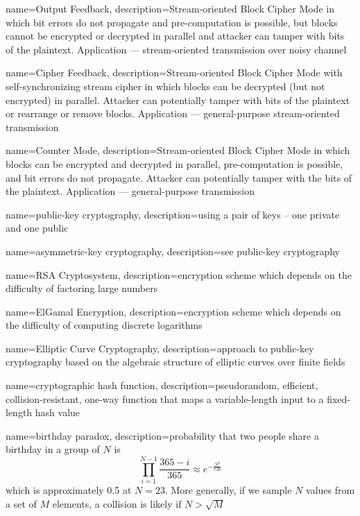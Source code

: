 {
    name={Output Feedback},
    description={Stream-oriented Block Cipher Mode in which bit errors do not propagate and pre-computation is possible, but blocks cannot be encrypted or decrypted in parallel and attacker can tamper with bits of the plaintext. Application --- stream-oriented transmission over noisy channel}
}

{
    name={Cipher Feedback},
    description={Stream-oriented Block Cipher Mode with self-synchronizing stream cipher in which blocks can be decrypted (but not encrypted) in parallel. Attacker can potentially tamper with bits of the plaintext or rearrange or remove blocks. Application --- general-purpose stream-oriented transmission}
}

{
    name={Counter Mode},
    description={Stream-oriented Block Cipher Mode in which blocks can be encrypted and decrypted in parallel, pre-computation is possible, and bit errors do not propagate. Attacker can potentially tamper with the bits of the plaintext. Application --- general-purpose transmission}
}

{
    name={public-key cryptography},
    description={using a pair of keys -- one private and one public}
}

{
    name={asymmetric-key cryptography},
    description={see \gls{public-key cryptography}}
}

{
    name={RSA Cryptosystem},
    description={encryption scheme which depends on the difficulty of factoring large numbers}
}

{
    name={ElGamal Encryption},
    description={encryption scheme which depends on the difficulty of computing discrete logarithms}
}

{
    name={Elliptic Curve Cryptography},
    description={approach to public-key cryptography based on the algebraic structure of elliptic curves over finite fields}
}

{
    name={cryptographic hash function},
    description={pseudorandom, efficient, collision-resistant, one-way function that maps a variable-length input to a fixed-length hash value}
}

{
    name={birthday paradox},
    description={probability that two people share a birthday in a group of $N$ is \[\prod_{i=1}^{N-1}\frac{365 - i}{365} \approx e^{-\frac{N^2}{730}}\] which is approximately 0.5 at $N=23$. More generally, if we sample $N$ values from a set of $M$ elements, a collision is likely if $N > \sqrt{M}$}
}

